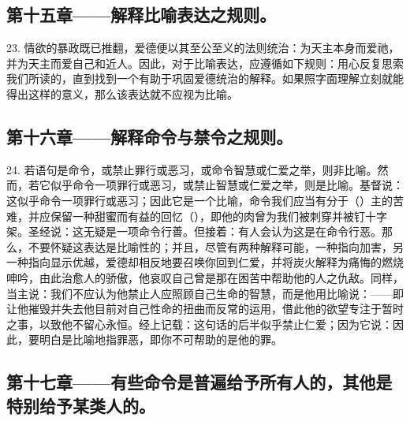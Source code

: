 
\subsection{第十五章——解释比喻表达之规则。}

23. 情欲的暴政既已推翻，爱德便以其至公至义的法则统治：为天主本身而爱祂，并为天主而爱自己和近人。因此，对于比喻表达，应遵循如下规则：用心反复思索我们所读的，直到找到一个有助于巩固爱德统治的解释。如果照字面理解立刻就能得出这样的意义，那么该表达就不应视为比喻。\par


\subsection{第十六章——解释命令与禁令之规则。}

24. 若语句是命令，或禁止罪行或恶习，或命令智慧或仁爱之举，则非比喻。然而，若它似乎命令一项罪行或恶习，或禁止智慧或仁爱之举，则是比喻。基督说：这似乎命令一项罪行或恶习；因此它是一个比喻，命令我们应当有分于（）主的苦难，并应保留一种甜蜜而有益的回忆（），即他的肉曾为我们被刺穿并被钉十字架。圣经说：这无疑是一项命令行善。但接着：有人会认为这是在命令行恶。那么，不要怀疑这表达是比喻性的；并且，尽管有两种解释可能，一种指向加害，另一种指向显示优越，爱德却相反地要召唤你回到仁爱，并将炭火解释为痛悔的燃烧呻吟，由此治愈人的骄傲，他哀叹自己曾是那在困苦中帮助他的人之仇敌。同样，当主说：我们不应认为他禁止人应照顾自己生命的智慧，而是他用比喻说：——即让他摧毁并失去他目前对自己性命的扭曲而反常的运用，借此他的欲望专注于暂时之事，以致他不留心永恒。经上记载：这句话的后半似乎禁止仁爱；因为它说：因此，要明白是比喻地指罪恶，即你不可帮助的是他的罪。\par


\subsection{第十七章——有些命令是普遍给予所有人的，其他是特别给予某类人的。}

